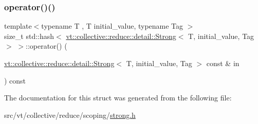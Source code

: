 \subsubsection{\texorpdfstring{operator()()}{operator()()}}
{\footnotesize\ttfamily template$<$typename T , T initial\+\_\+value, typename Tag $>$ \\
size\+\_\+t std\+::hash$<$ \hyperlink{structvt_1_1collective_1_1reduce_1_1detail_1_1_strong}{vt\+::collective\+::reduce\+::detail\+::\+Strong}$<$ T, initial\+\_\+value, Tag $>$ $>$\+::operator() (\begin{DoxyParamCaption}\item[{\hyperlink{structvt_1_1collective_1_1reduce_1_1detail_1_1_strong}{vt\+::collective\+::reduce\+::detail\+::\+Strong}$<$ T, initial\+\_\+value, Tag $>$ const \&}]{in }\end{DoxyParamCaption}) const\hspace{0.3cm}{\ttfamily [inline]}}



The documentation for this struct was generated from the following file\+:\begin{DoxyCompactItemize}
\item 
src/vt/collective/reduce/scoping/\hyperlink{strong_8h}{strong.\+h}\end{DoxyCompactItemize}
